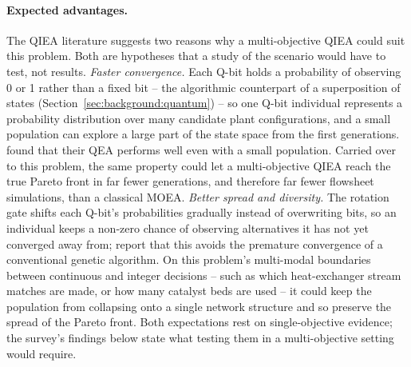 \paragraph{Expected advantages.}
The QIEA literature suggests two reasons why a multi-objective QIEA
could suit this problem. Both are hypotheses that a study of the
scenario would have to test, not results.
\emph{Faster convergence.} Each Q-bit holds a probability of observing
0 or 1 rather than a fixed bit -- the algorithmic counterpart of a
superposition of states (Section~\ref{sec:background:quantum}) -- so
one Q-bit individual represents a probability distribution over many
candidate plant configurations, and a small population can explore a
large part of the state space from the first generations.
\citet{han2002qea} found that their QEA performs well even with a small
population. Carried over to this problem, the same property could let a
multi-objective QIEA reach the true Pareto front in far fewer
generations, and therefore far fewer flowsheet simulations, than a
classical MOEA.
\emph{Better spread and diversity.} The rotation gate shifts each
Q-bit's probabilities gradually instead of overwriting bits, so an
individual keeps a non-zero chance of observing alternatives it has not
yet converged away from; \citet{han2002qea} report that this avoids the
premature convergence of a conventional genetic algorithm. On this
problem's multi-modal boundaries between continuous and integer
decisions -- such as which heat-exchanger stream matches are made, or
how many catalyst beds are used -- it could keep the population from
collapsing onto a single network structure and so preserve the spread
of the Pareto front. Both expectations rest on single-objective
evidence; the survey's findings below state what testing them in a
multi-objective setting would require.

